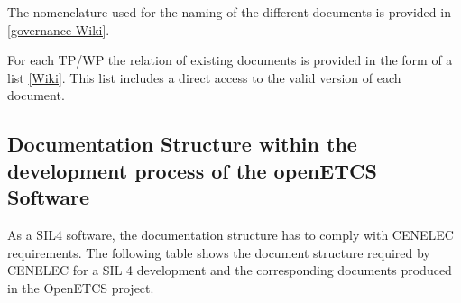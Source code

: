 \documentclass{template/openetcs_article}
\begin{document}
The nomenclature used for the naming of the different documents is provided in \href{https://github.com/openETCS/governance/wiki/Nomenclature-Guideline}{[governance Wiki]}.

For each TP/\gls{WP} the relation of existing documents is provided in the form of a list \href{https://github.com/openETCS/governance/wiki}{[Wiki]}. This list includes a direct access to the valid version of each document.

\subsection{Documentation Structure within the development process of the openETCS Software}
As a \gls{SIL}4 software, the documentation structure has to comply with CENELEC requirements. The following table shows the document structure required by CENELEC for a \gls{SIL} 4 development and the corresponding documents produced in the OpenETCS project.
\end{document}
